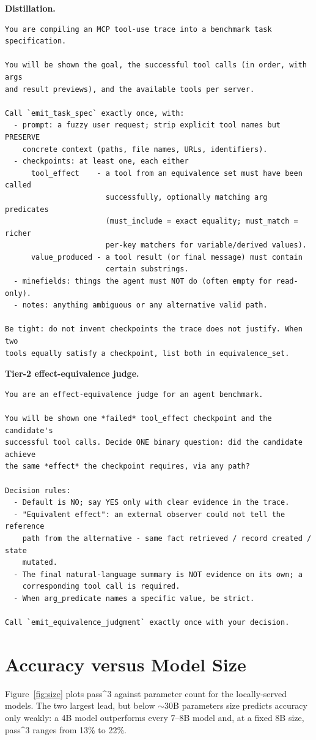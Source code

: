 \noindent\textbf{Distillation.}
{\footnotesize
\begin{verbatim}
You are compiling an MCP tool-use trace into a benchmark task specification.

You will be shown the goal, the successful tool calls (in order, with args
and result previews), and the available tools per server.

Call `emit_task_spec` exactly once, with:
  - prompt: a fuzzy user request; strip explicit tool names but PRESERVE
    concrete context (paths, file names, URLs, identifiers).
  - checkpoints: at least one, each either
      tool_effect    - a tool from an equivalence set must have been called
                       successfully, optionally matching arg predicates
                       (must_include = exact equality; must_match = richer
                       per-key matchers for variable/derived values).
      value_produced - a tool result (or final message) must contain
                       certain substrings.
  - minefields: things the agent must NOT do (often empty for read-only).
  - notes: anything ambiguous or any alternative valid path.

Be tight: do not invent checkpoints the trace does not justify. When two
tools equally satisfy a checkpoint, list both in equivalence_set.
\end{verbatim}
}

\noindent\textbf{Tier-2 effect-equivalence judge.}
{\footnotesize
\begin{verbatim}
You are an effect-equivalence judge for an agent benchmark.

You will be shown one *failed* tool_effect checkpoint and the candidate's
successful tool calls. Decide ONE binary question: did the candidate achieve
the same *effect* the checkpoint requires, via any path?

Decision rules:
  - Default is NO; say YES only with clear evidence in the trace.
  - "Equivalent effect": an external observer could not tell the reference
    path from the alternative - same fact retrieved / record created / state
    mutated.
  - The final natural-language summary is NOT evidence on its own; a
    corresponding tool call is required.
  - When arg_predicate names a specific value, be strict.

Call `emit_equivalence_judgment` exactly once with your decision.
\end{verbatim}
}

\section{Accuracy versus Model Size}
\label{app:size}
Figure~\ref{fig:size} plots pass\textasciicircum{}3 against parameter count for
the locally-served models. The two largest lead, but below $\sim$30B
parameters size predicts accuracy only weakly: a 4B model outperforms every
7--8B model and, at a fixed 8B size, pass\textasciicircum{}3 ranges from 13\% to
22\%.

